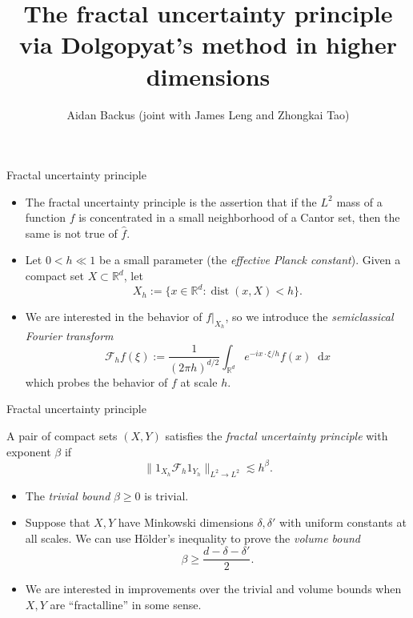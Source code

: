 \documentclass[10pt]{beamer}
\title[Higher-dimensional FUP via Dolgopyat]{The fractal uncertainty principle via Dolgopyat's method in higher dimensions}
\author[Backus, Leng, and Tao]{Aidan Backus (joint with James Leng and Zhongkai Tao)}
\newcommand{\RR}{\mathbb{R}}
\newcommand*\dif{\mathop{}\!\mathrm{d}}
\DeclareMathOperator{\dist}{dist}
\begin{document}
\begin{frame}
    \titlepage
\end{frame}

\begin{frame}{Fractal uncertainty principle}
\begin{itemize}
\item The fractal uncertainty principle is the assertion that if the $L^2$ mass of a function $f$ is concentrated in a small neighborhood of a Cantor set, then the same is not true of $\hat f$. \pause
\item Let $0 < h \ll 1$ be a small parameter (the \emph{effective Planck constant}).
Given a compact set $X \subset \RR^d$, let
$$X_h := \{x \in \RR^d: \dist(x, X) < h\}.$$ \pause
\item We are interested in the behavior of $f|_{X_h}$, so we introduce the \emph{semiclassical Fourier transform}
$$\mathscr F_h f(\xi) := \frac{1}{(2\pi h)^{d/2}} \int_{\RR^d} e^{-ix\cdot \xi/h} f(x) \dif x$$
which probes the behavior of $f$ at scale $h$.
\end{itemize}
\end{frame}

\begin{frame}{Fractal uncertainty principle}
\begin{definition}
A pair of compact sets $(X, Y)$ satisfies the \emph{fractal uncertainty principle} with exponent $\beta$ if
$$\|1_{X_h} \mathscr F_h 1_{Y_h}\|_{L^2 \to L^2} \lesssim h^\beta.$$
\end{definition} \pause

\begin{itemize}
\item The \emph{trivial bound} $\beta \geq 0$ is trivial. \pause
\item Suppose that $X, Y$ have Minkowski dimensions $\delta, \delta'$ with uniform constants at all scales. We can use H\"older's inequality to prove the \emph{volume bound}
$$\beta \geq \frac{d - \delta - \delta'}{2}.$$ \pause
\item We are interested in improvements over the trivial and volume bounds when $X, Y$ are ``fractalline'' in some sense.
\end{itemize}
\end{frame}
\end{document}
